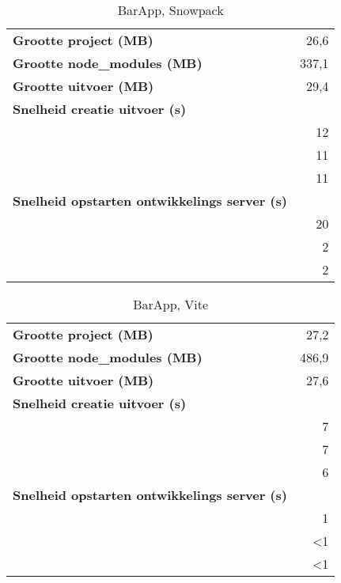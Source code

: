         \begin{table}[h]
            \centering
            \begin{tabular}{lr}
            \textbf{Grootte project (MB)} & 26,6 \\
            \textbf{Grootte node\_modules (MB)} & 337,1 \\
            \textbf{Grootte uitvoer (MB)} & 29,4 \\
            \textbf{Snelheid creatie uitvoer (s)} & \\
            \textbf{} & 12 \\
            \textbf{} & 11 \\
            \textbf{} & 11 \\
            \textbf{Snelheid opstarten ontwikkelings server (s)} & \\
            \textbf{} & 20 \\
            \textbf{} & 2 \\
            \textbf{} & 2
            \end{tabular}
            \caption{BarApp, Snowpack}
            \end{table}
 
            \begin{table}[h]
                \centering
                \begin{tabular}{lr}
                \textbf{Grootte project (MB)} & 27,2 \\
                \textbf{Grootte node\_modules (MB)} & 486,9 \\
                \textbf{Grootte uitvoer (MB)} & 27,6 \\
                \textbf{Snelheid creatie uitvoer (s)} & \\
                \textbf{} & 7 \\
                \textbf{} & 7 \\
                \textbf{} & 6 \\
                \textbf{Snelheid opstarten ontwikkelings server (s)} & \\
                \textbf{} & 1 \\
                \textbf{} & <1 \\
                \textbf{} & <1
                \end{tabular}
                \caption{BarApp, Vite}
                \end{table}